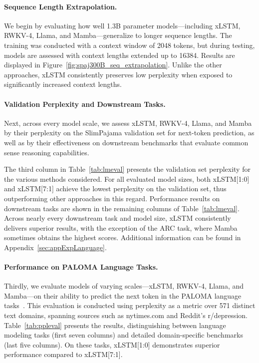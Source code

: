 \paragraph{Sequence Length Extrapolation.}
\label{sec:spaj300B_ctx_extrapolation}
We begin by evaluating how well 1.3B parameter models—including xLSTM, RWKV-4, Llama, and Mamba—generalize to longer sequence lengths. The training was conducted with a context window of 2048 tokens, but during testing, models are assessed with context lengths extended up to 16384. Results are displayed in Figure~\ref{fig:spaj300B_seq_extrapolation}. Unlike the other approaches, xLSTM consistently preserves low perplexity when exposed to significantly increased context lengths.

\paragraph{Validation Perplexity and Downstream Tasks.}
\label{sec:spaj_downstream_eval}
Next, across every model scale, we assess xLSTM, RWKV-4, Llama, and Mamba by their perplexity on the SlimPajama validation set for next-token prediction, as well as by their effectiveness on downstream benchmarks that evaluate common sense reasoning capabilities.

The third column in Table~\ref{tab:lmeval} presents the validation set perplexity for the various methods considered. For all evaluated model sizes, both xLSTM[1:0] and xLSTM[7:1] achieve the lowest perplexity on the validation set, thus outperforming other approaches in this regard. Performance results on downstream tasks are shown in the remaining columns of Table~\ref{tab:lmeval}. Across nearly every downstream task and model size, xLSTM consistently delivers superior results, with the exception of the ARC task, where Mamba sometimes obtains the highest scores. Additional information can be found in Appendix~\ref{sec:appExpLanguage}.

\paragraph{Performance on PALOMA Language Tasks.} Thirdly, we evaluate models of varying scales—xLSTM, RWKV-4, Llama, and Mamba—on their ability to predict the next token in the PALOMA language tasks~\citep{Magnusson:23arxivshort}. This evaluation is conducted using perplexity as a metric over 571 distinct text domains, spanning sources such as nytimes.com and Reddit's r/depression. Table~\ref{tab:ppleval} presents the results, distinguishing between language modeling tasks (first seven columns) and detailed domain-specific benchmarks (last five columns). On these tasks, xLSTM[1:0] demonstrates superior performance compared to xLSTM[7:1].

